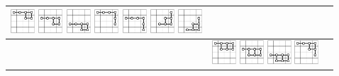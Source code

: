 \begin{table}
\begin{tabular}{p{1.2cm}l@{~~}r}
\includegraphics[width=0.9cm]{figures/NTuple-62.pdf}
\includegraphics[width=0.9cm]{figures/NTuple-63.pdf}
\includegraphics[width=0.9cm]{figures/NTuple-64.pdf}
\includegraphics[width=0.9cm]{figures/NTuple-65.pdf}
\includegraphics[width=0.9cm]{figures/NTuple-66.pdf}
\includegraphics[width=0.9cm]{figures/NTuple-67.pdf}
\includegraphics[width=0.9cm]{figures/NTuple-68.pdf}
& \raisebox{10pt}{$\begin{array}{r}
 \mbox{1 board, 2 stages}\\
612\,220\,032
 \end{array}$}
\\\hline
\raisebox{15pt}{\textsf{NT7}}
&
\includegraphics[width=0.9cm]{figures/NTuple-70.pdf}
\includegraphics[width=0.9cm]{figures/NTuple-71.pdf}
\includegraphics[width=0.9cm]{figures/NTuple-72.pdf}
\includegraphics[width=0.9cm]{figures/NTuple-73.pdf}

\end{tabular}
\end{table}
